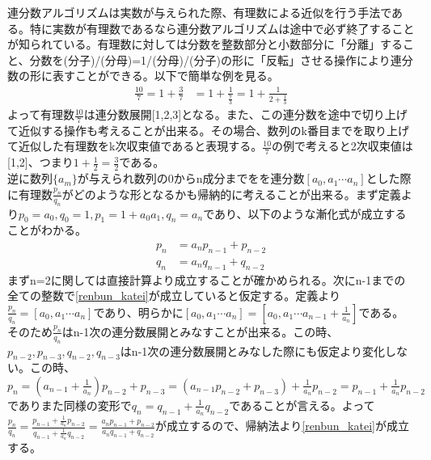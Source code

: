 \documentclass[a4paper,10.5pt]{article}
\numberwithin{equation}{section}
\begin{document}
連分数アルゴリズムは実数が与えられた際、有理数による近似を行う手法である。特に実数が有理数であるなら連分数アルゴリズムは途中で必ず終了することが知られている。有理数に対しては分数を整数部分と小数部分に「分離」すること、分数を(分子)/(分母)=1/{(分母)/(分子)}の形に「反転」させる操作により連分数の形に表すことができる。以下で簡単な例を見る。
 \begin{equation}\begin{split}
     \frac{10}{7} = 1 +\frac{3}{7} &=1+\frac{1}{\frac{7}{3}}=1+\frac{1}{2+\frac{1}{3}}
 \end{split} \end{equation}
よって有理数$\frac{10}{7}$は連分数展開[1,2,3]となる。また、この連分数を途中で切り上げて近似する操作も考えることが出来る。その場合、数列のk番目までを取り上げて近似した有理数をk次収束値であると表現する。$\frac{10}{7}$の例で考えると2次収束値は[1,2]、つまり$1+\frac{1}{2}=\frac{3}{2}$である。\\
逆に数列$\{a_{m}\}$が与えられ数列の0からn成分までをを連分数$[a_{0},a_{1} \cdots a_{n}]$とした際に有理数$\frac{p_{n}}{q_{n}}$がどのような形となるかも帰納的に考えることが出来る。まず定義より$p_{0}=a_{0},q_{0}=1,p_{1}=1+a_{0}a_{1},q_{n}=a_{n}$であり、以下のような漸化式が成立することがわかる。
\begin{equation}\begin{split}
     p_{n} &= a_{n}p_{n-1} +p_{n-2}\\
     q_{n} &= a_{n}q_{n-1} +q_{n-2} \label{renbun_katei}
\end{split} \end{equation}
まずn=2に関しては直接計算より成立することが確かめられる。次にn-1までの全ての整数で\eqref{renbun_katei}が成立していると仮定する。定義より$\frac{p_{n}}{q_{n}}=[a_{0},a_{1} \cdots a_{n}]$であり、明らかに$[a_{0},a_{1} \cdots a_{n}]=[a_{0},a_{1} \cdots a_{n-1}+\frac{1}{a_{n}}]$である。そのため$\frac{p_{n}}{q_{n}}$はn-1次の連分数展開とみなすことが出来る。この時、$p_{n-2},p_{n-3},q_{n-2},q_{n-3}$はn-1次の連分数展開とみなした際にも仮定より変化しない。この時、$p_{n}=(a_{n-1}+\frac{1}{a_{n}})p_{n-2}+p_{n-3}=(a_{n-1}p_{n-2}+p_{n-3})+\frac{1}{a_{n}}p_{n-2}=p_{n-1}+\frac{1}{a_{n}}p_{n-2}$でありまた同様の変形で$q_{n}=q_{n-1}+\frac{1}{a_{n}}q_{n-2}$であることが言える。よって$\frac{p_{n}}{q_{n}}=\frac{p_{n-1}+\frac{1}{a_{n}}p_{n-2}}{q_{n-1}+\frac{1}{a_{n}}q_{n-2}}=\frac{a_{n}p_{n-1} +p_{n-2}}{a_{n}q_{n-1} +q_{n-2}}$が成立するので、帰納法より\eqref{renbun_katei}が成立する。\\
\end{document}
